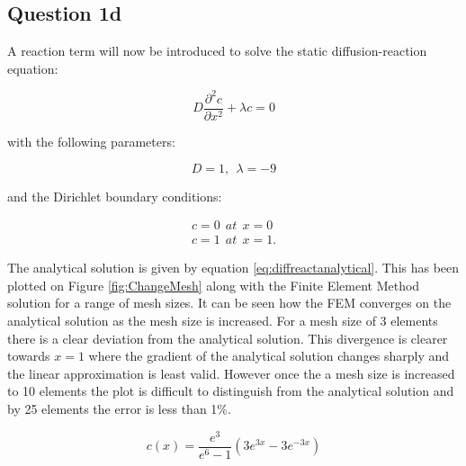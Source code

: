 \documentclass[11pt]{article}
\begin{document}
\pagebreak

\subsection{Question 1d}

A reaction term will now be introduced to solve the static diffusion-reaction equation:

\begin{equation*}
D \frac{\partial^2 c}{\partial x^2} + \lambda c = 0
\end{equation*}

with the following parameters:

\begin{equation*}
D = 1, \ \  \lambda = -9
\end{equation*}

and the Dirichlet boundary conditions:


\begin{align*}
c = 0 \ \ at \ \ x = 0 \\
c = 1 \ \ at \ \  x= 1  .
\end{align*}


The analytical solution is given by equation \ref{eq:diffreactanalytical}. This has been plotted on Figure \ref{fig:ChangeMesh} along with the Finite Element Method solution for a range of mesh sizes. It can be seen how the FEM converges on the analytical solution as the mesh size is increased. For a mesh size of 3 elements there is a clear deviation from the analytical solution. This divergence is clearer towards $x = 1$ where the gradient of the analytical solution changes sharply and the linear approximation is least valid. However once the a mesh size is increased to 10 elements the plot is difficult to distinguish from the analytical solution and by 25 elements the error is less than 1\%.

\begin{equation}\label{eq:diffreactanalytical}
c(x) = \frac{e^3 }{e^6 - 1} (3e^{3x} - 3e^{-3x})
\end{equation}
\end{document}
